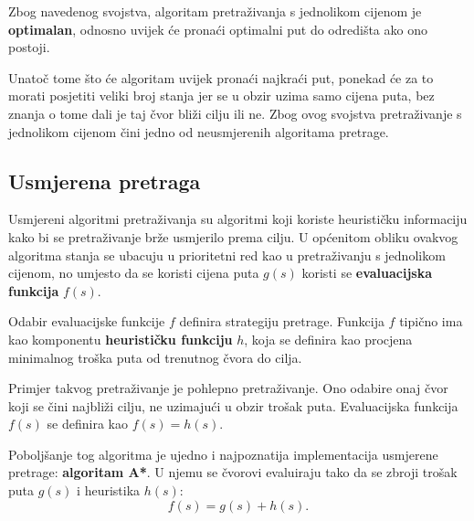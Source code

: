 \documentclass[times, utf8, zavrsni, numeric]{fer}
\begin{document}
\begin{minipage}{\textwidth}
	
\end{minipage}

\par Zbog navedenog svojstva, algoritam pretraživanja s jednolikom cijenom je \textbf{optimalan}, odnosno uvijek će pronaći optimalni put do odredišta ako ono postoji.


\par Unatoč tome što će algoritam uvijek pronaći najkraći put, ponekad će za to morati posjetiti veliki broj stanja jer se u obzir uzima samo cijena puta, bez znanja o tome dali je taj čvor bliži cilju ili ne. 
Zbog ovog svojstva pretraživanje s jednolikom cijenom čini jedno od neusmjerenih algoritama pretrage.

\subsection{Usmjerena pretraga}

\par Usmjereni algoritmi pretraživanja su algoritmi koji koriste heurističku informaciju kako bi se pretraživanje brže usmjerilo prema cilju.
U općenitom obliku ovakvog algoritma stanja se ubacuju u prioritetni red kao u pretraživanju s jednolikom cijenom, no umjesto da se koristi cijena puta \(g(s)\) koristi se \textbf{evaluacijska funkcija} \(f(s)\).

\par Odabir evaluacijske funkcije \(f\) definira strategiju pretrage. 
Funkcija \(f\) tipično ima kao komponentu \textbf{heurističku funkciju} \(h\), koja se definira kao procjena minimalnog troška puta od trenutnog čvora do cilja\cite{book:AIModernApproach}.

\par Primjer takvog pretraživanje je pohlepno pretraživanje. 
Ono odabire onaj čvor koji se čini najbliži cilju, ne uzimajući u obzir trošak puta.
Evaluacijska funkcija \(f(s)\) se definira kao \(f(s) = h(s)\).

\par Poboljšanje tog algoritma je ujedno i najpoznatija implementacija usmjerene pretrage: \textbf{algoritam A*}. 
U njemu se čvorovi evaluiraju tako da se zbroji trošak puta \(g(s)\) i heuristika \(h(s)\):
\begin{equation}
f(s) = g(s) + h(s).
\end{equation} 
\end{document}

